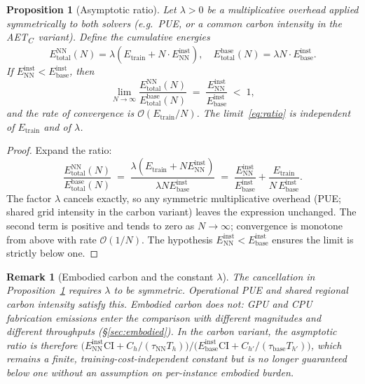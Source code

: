 \documentclass[11pt]{article}
\newtheorem{proposition}{Proposition}
\newtheorem{remark}{Remark}
\newcommand{\AETC}{AET\textsubscript{C}}
\begin{document}
\begin{proposition}[Asymptotic ratio]
\label{prop:asymp}
Let \(\lambda > 0\) be a multiplicative overhead applied symmetrically to both solvers (e.g.\ PUE, or a common carbon intensity in the \AETC\ variant). Define the cumulative energies
\[
  E_\text{total}^\text{NN}(N) = \lambda\!\left(E_\text{train} + N \cdot E_\text{NN}^\text{inst}\right),
  \quad
  E_\text{total}^\text{base}(N) = \lambda N \cdot E_\text{base}^\text{inst}.
\]
If \(E_\text{NN}^\text{inst} < E_\text{base}^\text{inst}\), then
\begin{equation}
  \lim_{N \to \infty}
  \frac{E_\text{total}^\text{NN}(N)}{E_\text{total}^\text{base}(N)}
  \;=\;
  \frac{E_\text{NN}^\text{inst}}{E_\text{base}^\text{inst}}
  \;<\; 1,
  \label{eq:ratio}
\end{equation}
and the rate of convergence is \(\mathcal{O}(E_\text{train}/N)\). The limit~\eqref{eq:ratio} is independent of \(E_\text{train}\) and of \(\lambda\).
\end{proposition}

\begin{proof}
Expand the ratio:
\[
  \frac{E_\text{total}^\text{NN}(N)}{E_\text{total}^\text{base}(N)}
  \;=\;
  \frac{\lambda(E_\text{train} + N E_\text{NN}^\text{inst})}{\lambda N E_\text{base}^\text{inst}}
  \;=\;
  \frac{E_\text{NN}^\text{inst}}{E_\text{base}^\text{inst}}
  + \frac{E_\text{train}}{N\,E_\text{base}^\text{inst}}.
\]
The factor \(\lambda\) cancels exactly, so any symmetric multiplicative overhead (PUE; shared grid intensity in the carbon variant) leaves the expression unchanged. The second term is positive and tends to zero as \(N \to \infty\); convergence is monotone from above with rate \(\mathcal{O}(1/N)\). The hypothesis \(E_\text{NN}^\text{inst} < E_\text{base}^\text{inst}\) ensures the limit is strictly below one.
\end{proof}

\begin{remark}[Embodied carbon and the constant \(\lambda\)]
\label{rem:embodied-lambda}
The cancellation in Proposition~\ref{prop:asymp} requires \(\lambda\) to be \emph{symmetric}. Operational PUE and shared regional carbon intensity satisfy this. Embodied carbon does \emph{not}: GPU and CPU fabrication emissions enter the comparison with different magnitudes and different throughputs (\S\ref{sec:embodied}). In the carbon variant, the asymptotic ratio is therefore \(\bigl(E_\text{NN}^\text{inst} \mathrm{CI} + C_h/(\tau_\text{NN} T_h)\bigr) / \bigl(E_\text{base}^\text{inst} \mathrm{CI} + C_{h'}/(\tau_\text{base} T_{h'})\bigr)\), which remains a finite, training-cost-independent constant but is no longer guaranteed below one without an assumption on per-instance embodied burden.
\end{remark}
\end{document}
